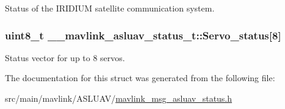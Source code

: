 Status of the I\+R\+I\+D\+I\+U\+M satellite communication system. 

\hypertarget{struct____mavlink__asluav__status__t_a2c305b7b0a1a08c3f6b114149d968ca6}{
\subsubsection[{Servo\+\_\+status}]{\setlength{\rightskip}{0pt plus 5cm}uint8\+\_\+t \+\_\+\+\_\+mavlink\+\_\+asluav\+\_\+status\+\_\+t\+::\+Servo\+\_\+status\mbox{[}8\mbox{]}}}\label{struct____mavlink__asluav__status__t_a2c305b7b0a1a08c3f6b114149d968ca6}


Status vector for up to 8 servos. 



The documentation for this struct was generated from the following file\+:\begin{DoxyCompactItemize}
\item 
src/main/mavlink/\+A\+S\+L\+U\+A\+V/\hyperlink{mavlink__msg__asluav__status_8h}{mavlink\+\_\+msg\+\_\+asluav\+\_\+status.\+h}\end{DoxyCompactItemize}
